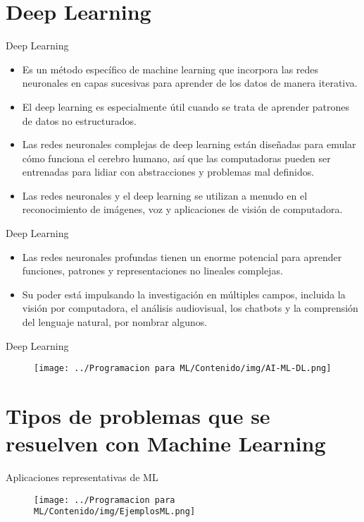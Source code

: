 \documentclass[11pt,aspectratio=169]{beamer}
\begin{document}
\section{Deep Learning}
\begin{frame}{Deep Learning}
\begin{itemize}
	\item Es un método específico de machine learning que incorpora las redes neuronales en capas sucesivas para aprender de los datos de
		manera iterativa.\pause
	\item El deep learning es especialmente útil cuando se trata de aprender patrones de datos no estructurados.\pause
	\item Las redes neuronales complejas de deep learning están diseñadas para emular cómo funciona el cerebro humano, así que las computadoras 
		pueden ser entrenadas para lidiar con abstracciones y problemas mal definidos.\pause
	\item Las redes neuronales y el deep learning se utilizan a menudo en el reconocimiento de imágenes, voz y aplicaciones de visión de computadora.
\end{itemize}
\end{frame}

\begin{frame}{Deep Learning}
\begin{itemize}
	\item Las redes neuronales profundas tienen un enorme potencial para aprender funciones, patrones y representaciones no lineales complejas.\pause
	\item Su poder está impulsando la investigación en múltiples campos, incluida la visión por computadora, el análisis audiovisual, los chatbots 
		y la comprensión del lenguaje natural, por nombrar algunos.
\end{itemize}
\end{frame}

\begin{frame}{Deep Learning}
\begin{figure}[H]
	\centering
	\texttt{[image: ../Programacion para ML/Contenido/img/AI-ML-DL.png]}
\end{figure}
\end{frame}

\section{Tipos de problemas que se resuelven con Machine Learning}
\begin{frame}{Aplicaciones representativas de ML}
\begin{figure}[H]
	\centering
	\texttt{[image: ../Programacion para ML/Contenido/img/EjemplosML.png]}
\end{figure}
\end{frame}
\end{document}
